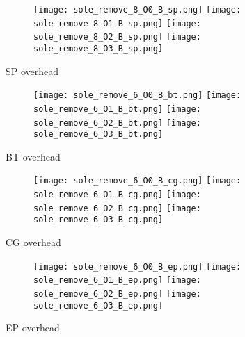 \documentclass[11pt]{article}
\begin{document}
    \begin{figure}[!ht]
        \begin{subfigure}{\linewidth}
            \texttt{[image: sole\_remove\_8\_O0\_B\_sp.png]}
            \texttt{[image: sole\_remove\_8\_O1\_B\_sp.png]}
            \texttt{[image: sole\_remove\_8\_O2\_B\_sp.png]}
            \texttt{[image: sole\_remove\_8\_O3\_B\_sp.png]}
        \end{subfigure}\par\medskip
        \caption{SP overhead}
    \end{figure}

    \newpage


    \begin{figure}[!ht]
        \begin{subfigure}{\linewidth}
            \texttt{[image: sole\_remove\_6\_O0\_B\_bt.png]}\hfill
            \texttt{[image: sole\_remove\_6\_O1\_B\_bt.png]}\hfill
            \texttt{[image: sole\_remove\_6\_O2\_B\_bt.png]}\hfill
            \texttt{[image: sole\_remove\_6\_O3\_B\_bt.png]}\hfill
        \end{subfigure}\par\medskip
        \caption{BT overhead}
    \end{figure}

    \begin{figure}[!ht]
        \begin{subfigure}{\linewidth}
            \texttt{[image: sole\_remove\_6\_O0\_B\_cg.png]}\hfill
            \texttt{[image: sole\_remove\_6\_O1\_B\_cg.png]}\hfill
            \texttt{[image: sole\_remove\_6\_O2\_B\_cg.png]}\hfill
            \texttt{[image: sole\_remove\_6\_O3\_B\_cg.png]}\hfill
        \end{subfigure}\par\medskip
        \caption{CG overhead}
    \end{figure}
\begin{figure}[!ht]
        \begin{subfigure}{\linewidth}
            \texttt{[image: sole\_remove\_6\_O0\_B\_ep.png]}\hfill
            \texttt{[image: sole\_remove\_6\_O1\_B\_ep.png]}\hfill
            \texttt{[image: sole\_remove\_6\_O2\_B\_ep.png]}\hfill
            \texttt{[image: sole\_remove\_6\_O3\_B\_ep.png]}\hfill
        \end{subfigure}\par\medskip
        \caption{EP overhead}
\end{figure}
\end{document}
